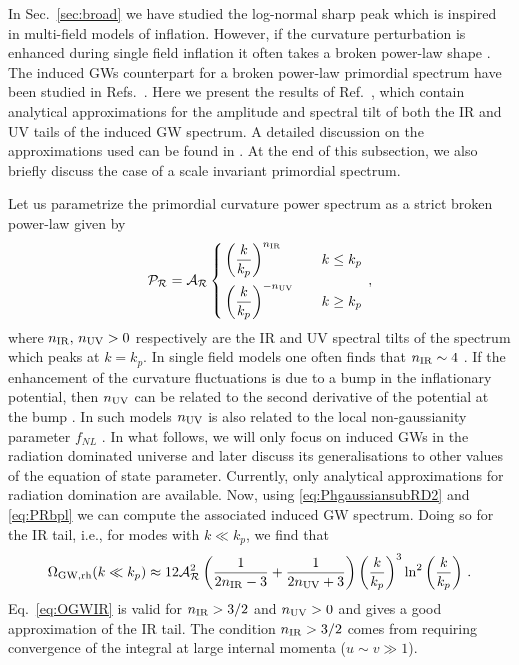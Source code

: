 \documentclass[a4paper,11pt]{article}
\numberwithin{equation}{section}
\begin{document}
In Sec.~\ref{sec:broad} we have studied the log-normal sharp peak which is inspired in multi-field models of inflation. However, if the curvature perturbation is enhanced during single field inflation it often takes a broken power-law shape \cite{Byrnes:2018txb,Atal:2018neu,Carrilho:2019oqg,Ozsoy:2019lyy}. The induced GWs counterpart for a broken power-law primordial spectrum have been studied in Refs.~\cite{Clesse:2018ogk,Xu:2019bdp,Liu:2020oqe,Riccardi:2021rlf,Atal:2021jyo}. Here we present the results of Ref.~\cite{Atal:2021jyo}, which contain analytical approximations for the amplitude and spectral tilt of both the IR and UV tails of the induced GW spectrum. A detailed discussion on the approximations used can be found in \cite{Atal:2021jyo}. At the end of this subsection, we also briefly discuss the case of a scale invariant primordial spectrum.

Let us parametrize the primordial curvature power spectrum as a strict broken power-law given by
\begin{align}\label{eq:PRbpl}
{\cal P}_{\cal R}={\cal A}_{\cal R}\left\{
\begin{aligned}
&\left(\frac{k}{k_p}\right)^{n_{\rm IR}}\quad &k\leq k_p\\
&\left(\frac{k}{k_p}\right)^{-n_{\rm UV}}\quad &k\geq k_p
\end{aligned}
\right.\,,
\end{align}
where $n_{\rm IR},\,n_{\rm UV}>0$ respectively are the IR and UV spectral tilts of the spectrum which peaks at $k=k_p$. In single field models one often finds that $n_{\rm IR}\sim 4$ \cite{Byrnes:2018txb}. If the enhancement of the curvature fluctuations is due to a bump in the inflationary potential, then $n_{\rm UV}$ can be related to the second derivative of the potential at the bump \cite{Atal:2018neu,Liu:2020oqe}. In such models $n_{\rm UV}$ is also related to the local non-gaussianity parameter $f_{NL}$ \cite{Atal:2018neu}. In what follows, we will only focus on induced GWs in the radiation dominated universe and later discuss its generalisations to other values of the equation of state parameter. Currently, only analytical approximations for radiation domination are available. Now, using \eqref{eq:PhgaussiansubRD2} and \eqref{eq:PRbpl} we can compute the associated induced GW spectrum. Doing so for the IR tail, i.e., for modes with $k\ll k_p$, we find that
\begin{align}\label{eq:OGWIR}
\Omega_{\rm GW,rh}(k\ll k_{p})\approx 12{\cal A}_{\cal R}^2\left(\frac{1}{2n_{\rm IR}-3}+\frac{1}{2n_{\rm UV}+3}\right)\left(\frac{k}{k_p}\right)^{3}\ln^2\left(\frac{k}{k_p}\right)\,.
\end{align}
Eq.~\eqref{eq:OGWIR} is valid for $n_{\rm IR}>3/2$ and $n_{\rm UV}>0$ and gives a good approximation of the IR tail. The condition $n_{\rm IR}>3/2$ comes from requiring convergence of the integral at large internal momenta ($u\sim v\gg 1$).
\end{document}
